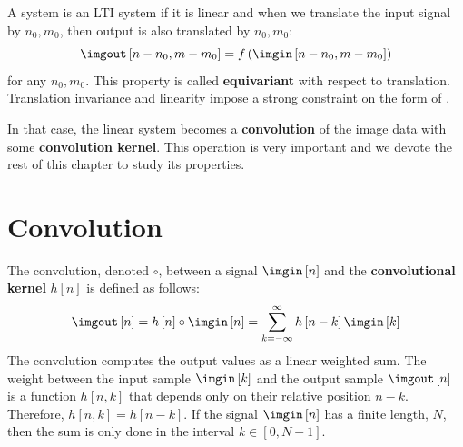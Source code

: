 %
A system is an LTI system if it is linear and when we translate the input signal by $n_0, m_0$, then output is also translated by $n_0, m_0$:
\begin{equation}
	\imgout \left[ n - n_0, m-m_0 \right] = f \left( \imgin \left[ n-n_0, m-m_0 \right] \right)
\end{equation}
for any $n_0,m_0$. This property is called {\bf equivariant}
with respect to translation. Translation invariance and linearity impose a strong constraint on the form of \eqn{\ref{eq:general_lin_filter}}.


In that case, the linear system becomes a {\bf convolution} of the image data with some {\bf convolution kernel}. This operation is very important and we devote the rest of this chapter to study its properties.


\section{Convolution}

The convolution, denoted $\circ$, between a signal $\imgin \left[n \right]$ and the {\bf convolutional kernel} $h\left[n \right]$ is defined as follows:
\begin{equation}
	\imgout \left[n\right] = h \left[n\right] \circ \imgin \left[n\right] =  \sum_{k=-\infty}^{\infty} h \left[n-k \right] \imgin \left[k \right]
	\label{eq:1dconv}
\end{equation}
The convolution computes the output values as a linear weighted sum. The weight between the input sample $\imgin \left[k \right]$ and the output sample $\imgout \left[n\right]$ is a function $h\left[n, k \right]$ that depends only on their relative position $n-k$. Therefore, $h\left[n, k \right]=h\left[n-k \right]$. If the signal $\imgin \left[n \right]$ has a finite length, $N$, then the sum is only done in the interval $k \in \left[0,N-1\right]$.

